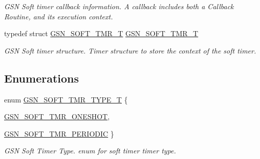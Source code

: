 \begin{DoxyCompactItemize}
\begin{DoxyCompactList}\small\item\em GSN Soft timer callback information. A callback includes both a Callback Routine, and its execution context. \end{DoxyCompactList}\item 
typedef struct \hyperlink{a00229}{GSN\_\-SOFT\_\-TMR\_\-T} \hyperlink{a00673_gac713d53bc7c13a7102bfce1b01b30c60}{GSN\_\-SOFT\_\-TMR\_\-T}
\begin{DoxyCompactList}\small\item\em GSN Soft timer structure. Timer structure to store the context of the soft timer. \end{DoxyCompactList}\end{DoxyCompactItemize}
\subsection*{Enumerations}
\begin{DoxyCompactItemize}
\item 
enum \hyperlink{a00673_ga599ea0a212c1bcd484a64610d070b5af}{GSN\_\-SOFT\_\-TMR\_\-TYPE\_\-T} \{ \par
\hyperlink{a00673_gga599ea0a212c1bcd484a64610d070b5afaed34a4f447dd6a4da5771c0a29d502c3}{GSN\_\-SOFT\_\-TMR\_\-ONESHOT}, 
\par
\hyperlink{a00673_gga599ea0a212c1bcd484a64610d070b5afa0fdc43c704fbf8c462b2e87ddc6aea6d}{GSN\_\-SOFT\_\-TMR\_\-PERIODIC}
 \}
\begin{DoxyCompactList}\small\item\em GSN Soft Timer Type. enum for soft timer timer type. \end{DoxyCompactList}\end{DoxyCompactItemize}
